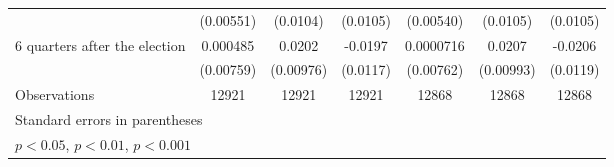 \begin{table}[htbp]
\begin{tabular}{l*{6}{c}}
                    &   (0.00551)         &    (0.0104)         &    (0.0105)         &   (0.00540)         &    (0.0105)         &    (0.0105)         \\
[1em]
 6 quarters after the election&    0.000485         &      0.0202\sym{*}  &     -0.0197         &   0.0000716         &      0.0207\sym{*}  &     -0.0206         \\
                    &   (0.00759)         &   (0.00976)         &    (0.0117)         &   (0.00762)         &   (0.00993)         &    (0.0119)         \\
\hline
Observations        &       12921         &       12921         &       12921         &       12868         &       12868         &       12868         \\
\hline\hline
\multicolumn{7}{l}{\footnotesize Standard errors in parentheses}\\
\multicolumn{7}{l}{\footnotesize \sym{*} \(p<0.05\), \sym{**} \(p<0.01\), \sym{***} \(p<0.001\)}\\
\end{tabular}
\end{table}
